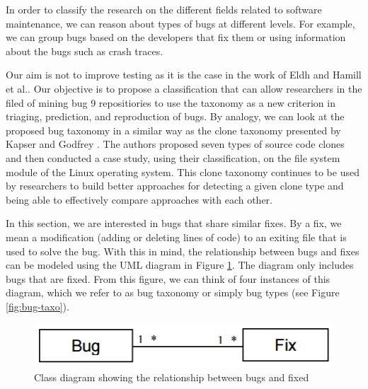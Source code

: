 
In order to classify the research on the different fields related to software maintenance, we can reason about types of bugs at different levels. For
example, we can group bugs based on the developers that fix
them or using information about the bugs such as crash traces.


Our aim is not to improve testing as it is the case in the work of Eldh \cite{Eldh2001} and Hamill et al.\cite{Hamill2014}.
Our objective is to propose a classification that can allow researchers in the filed of mining bug 9 repositiories to use the taxonomy as a new criterion in triaging, prediction, and reproduction of bugs.
By analogy, we can look at the proposed bug taxonomy in a similar way as the clone taxonomy presented by Kapser and Godfrey \cite{CoryKapser}.
The authors proposed seven types of source code clones and then conducted a case study, using their classification, on the file system module of the Linux operating system.
This clone taxonomy continues to be used by researchers to build better approaches for detecting a given clone type and being able to effectively compare approaches with each other.

In this section, we are interested in bugs that share similar fixes.
By a fix, we mean a modification (adding or deleting lines of
code) to an exiting file that is used to solve the bug. With this
in mind, the relationship between bugs and fixes can be
modeled using the UML diagram in Figure \ref{fig:bug-taxo-diag}. The diagram
only includes bugs that are fixed. From this figure, we can
think of four instances of this diagram, which we refer to as
bug taxonomy or simply bug types (see Figure \ref{fig:bug-taxo}).



\begin{figure}[h!]
  \centering
    \includegraphics[scale=0.5]{media/bug-taxo-class-diag.png}
    \caption{Class diagram showing the relationship between bugs and fixed
    \label{fig:bug-taxo-diag}}
\end{figure}

